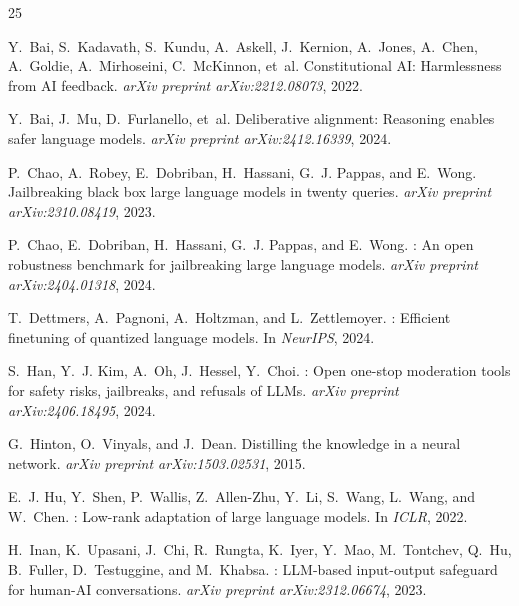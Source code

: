 \documentclass[11pt]{article}
\begin{document}
\begin{thebibliography}{25}

Y.~Bai, S.~Kadavath, S.~Kundu, A.~Askell, J.~Kernion, A.~Jones, A.~Chen, A.~Goldie, A.~Mirhoseini, C.~McKinnon, et~al.
\newblock Constitutional {AI}: Harmlessness from {AI} feedback.
\newblock \emph{arXiv preprint arXiv:2212.08073}, 2022.

Y.~Bai, J.~Mu, D.~Furlanello, et~al.
\newblock Deliberative alignment: Reasoning enables safer language models.
\newblock \emph{arXiv preprint arXiv:2412.16339}, 2024.

P.~Chao, A.~Robey, E.~Dobriban, H.~Hassani, G.~J. Pappas, and E.~Wong.
\newblock Jailbreaking black box large language models in twenty queries.
\newblock \emph{arXiv preprint arXiv:2310.08419}, 2023.

P.~Chao, E.~Dobriban, H.~Hassani, G.~J. Pappas, and E.~Wong.
: An open robustness benchmark for jailbreaking large language models.
\newblock \emph{arXiv preprint arXiv:2404.01318}, 2024.

T.~Dettmers, A.~Pagnoni, A.~Holtzman, and L.~Zettlemoyer.
: Efficient finetuning of quantized language models.
\newblock In \emph{NeurIPS}, 2024.

S.~Han, Y.~J. Kim, A.~Oh, J.~Hessel, Y.~Choi.
: Open one-stop moderation tools for safety risks, jailbreaks, and refusals of {LLMs}.
\newblock \emph{arXiv preprint arXiv:2406.18495}, 2024.

G.~Hinton, O.~Vinyals, and J.~Dean.
\newblock Distilling the knowledge in a neural network.
\newblock \emph{arXiv preprint arXiv:1503.02531}, 2015.

E.~J. Hu, Y.~Shen, P.~Wallis, Z.~Allen-Zhu, Y.~Li, S.~Wang, L.~Wang, and W.~Chen.
: Low-rank adaptation of large language models.
\newblock In \emph{ICLR}, 2022.

H.~Inan, K.~Upasani, J.~Chi, R.~Rungta, K.~Iyer, Y.~Mao, M.~Tontchev, Q.~Hu, B.~Fuller, D.~Testuggine, and M.~Khabsa.
: {LLM}-based input-output safeguard for human-{AI} conversations.
\newblock \emph{arXiv preprint arXiv:2312.06674}, 2023.


\end{thebibliography}
\end{document}
